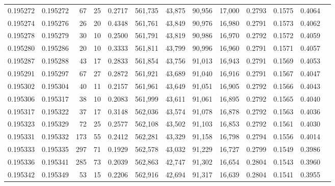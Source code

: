 \begin{tabular}{rrrrrrrrrrrrr}
0.195272 & 0.195272 &    67 &  25 &                                     0.2717 & 561,735 &  43,875 &  90,956 &  17,000 & 0.2793 & 0.1575 & 0.4064 \\
0.195274 & 0.195276 &    26 &  20 &                                     0.4348 & 561,761 &  43,849 &  90,976 &  16,980 & 0.2791 & 0.1573 & 0.4062 \\
0.195278 & 0.195279 &    30 &  10 &                                     0.2500 & 561,791 &  43,819 &  90,986 &  16,970 & 0.2792 & 0.1572 & 0.4059 \\
0.195280 & 0.195286 &    20 &  10 &                                     0.3333 & 561,811 &  43,799 &  90,996 &  16,960 & 0.2791 & 0.1571 & 0.4057 \\
0.195287 & 0.195288 &    43 &  17 &                                     0.2833 & 561,854 &  43,756 &  91,013 &  16,943 & 0.2791 & 0.1569 & 0.4053 \\
0.195291 & 0.195297 &    67 &  27 &                                     0.2872 & 561,921 &  43,689 &  91,040 &  16,916 & 0.2791 & 0.1567 & 0.4047 \\
0.195302 & 0.195304 &    40 &  11 &                                     0.2157 & 561,961 &  43,649 &  91,051 &  16,905 & 0.2792 & 0.1566 & 0.4043 \\
0.195306 & 0.195317 &    38 &  10 &                                     0.2083 & 561,999 &  43,611 &  91,061 &  16,895 & 0.2792 & 0.1565 & 0.4040 \\
0.195317 & 0.195322 &    37 &  17 &                                     0.3148 & 562,036 &  43,574 &  91,078 &  16,878 & 0.2792 & 0.1563 & 0.4036 \\
0.195323 & 0.195329 &    72 &  25 &                                     0.2577 & 562,108 &  43,502 &  91,103 &  16,853 & 0.2792 & 0.1561 & 0.4030 \\
0.195331 & 0.195332 &   173 &  55 &                                     0.2412 & 562,281 &  43,329 &  91,158 &  16,798 & 0.2794 & 0.1556 & 0.4014 \\
0.195333 & 0.195335 &   297 &  71 &                                     0.1929 & 562,578 &  43,032 &  91,229 &  16,727 & 0.2799 & 0.1549 & 0.3986 \\
0.195336 & 0.195341 &   285 &  73 &                                     0.2039 & 562,863 &  42,747 &  91,302 &  16,654 & 0.2804 & 0.1543 & 0.3960 \\
0.195342 & 0.195349 &    53 &  15 &                                     0.2206 & 562,916 &  42,694 &  91,317 &  16,639 & 0.2804 & 0.1541 & 0.3955 \\

\end{tabular}
